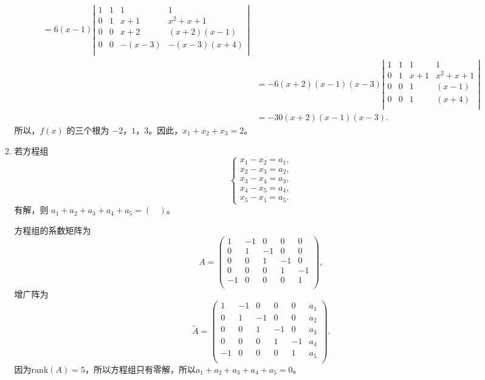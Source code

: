 \begin{enumerate}[1~]
\begin{enumerate}[1.~]
\begin{solution}
\begin{align*}
=6\left( x-1 \right) \left| \begin{matrix}
	1&		1&		1&		1\\
	0&		1&		x+1&		x^2+x+1\\
	0&		0&		x+2&		\left( x+2 \right) \left( x-1 \right)\\
	0&		0&		-\left( x-3 \right)&		-\left( x-3 \right) \left( x+4 \right)\\
\end{matrix} \right|\\
&=-6\left( x+2 \right) \left( x-1 \right) \left( x-3 \right) \left| \begin{matrix}
	1&		1&		1&		1\\
	0&		1&		x+1&		x^2+x+1\\
	0&		0&		1&		\left( x-1 \right)\\
	0&		0&		1&		\left( x+4 \right)\\
\end{matrix} \right|\\
&=-30\left( x+2 \right) \left( x-1 \right) \left( x-3 \right).
\end{align*}
所以，$f(x)$ 的三个根为 $-2$，$1$，$3$。因此，$x_1+x_2+x_3=2$。
\end{solution}

\item
若方程组
$$
\left\{ \begin{array} { l } { x _ { 1 } - x _ { 2 } = a _ { 1 } }, \\ { x _ { 2 } - x _ { 3 } = a _ { 2 } } ,\\ { x _ { 3 } - x _ { 4 } = a _ { 3 } }, \\ { x _ { 4 } - x _ { 5 } = a _ { 4 } } ,\\ { x _ { 5 } - x _ { 1 } = a _ { 5 } }. \end{array} \right.
$$
有解，则 $a_1 + a_2 + a_3 + a_4 + a_5 = (\ \ \ \ )$。
\begin{solution}
方程组的系数矩阵为\[
A=\left( \begin{matrix}
	1&		-1&		0&		0&		0\\
	0&		1&		-1&		0&		0\\
	0&		0&		1&		-1&		0\\
	0&		0&		0&		1&		-1\\
	-1&		0&		0&		0&		1\\
\end{matrix} \right),\]
增广阵为\[
\tilde{A}=\left( \begin{matrix}
	1&		-1&		0&		0&		0&a_1\\
	0&		1&		-1&		0&		0&a_2\\
	0&		0&		1&		-1&		0&a_3\\
	0&		0&		0&		1&		-1&a_4  \\
	-1&		0&		0&		0&		1&a_5\\
\end{matrix} \right).\]
因为$\mathrm{rank}(A)=5$，所以方程组只有零解，所以$a_1+a_2+a_3+a_4+a_5=0$。
\end{solution}


\end{enumerate}
\end{enumerate}
